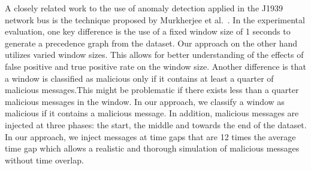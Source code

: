 A closely related work to the use of anomaly detection applied in the J1939 network bus is the technique proposed by Murkherjee et al.~\cite{Mukherjee2017APG}. In the experimental evaluation, one key difference is the use of a fixed window size of 1 seconds to generate a precedence graph from the dataset. Our approach on the other hand utilizes varied window sizes. This allows for better understanding of the effects of false positive and true positive rate on the window size.  Another difference is that a window is classified as malicious only if it contains at least a quarter of malicious messages.This might be problematic if there exists less than a quarter malicious messages in the window. In our approach, we classify a window as malicious if it contains a malicious message. In addition, malicious messages are injected at three phases: the start, the middle and towards the end of the dataset. In our approach, we inject messages at time gaps that are 12 times the average time gap which allows a realistic and thorough simulation of malicious messages without time overlap. 



















